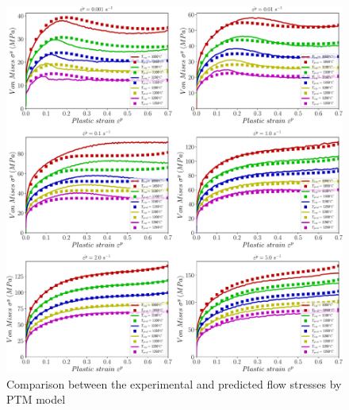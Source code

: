 \documentclass[twoside,english,1p,final,sort&compress]{elsarticle}
\theoremstyle{plain}
\begin{document}
\begin{figure}[!ht]
\centering
\includegraphics[width=1.02\columnwidth]
{Figures/CompExpPTM}
\caption{Comparison between the experimental and predicted flow stresses by PTM model }
\label{fig:iCorrelationPTM}
\end{figure}
\FloatBarrier

\end{document}
